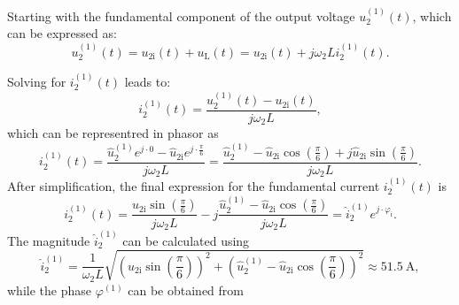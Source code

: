 \begin{solutionblock}
    Starting with the fundamental component of the output voltage $u^\mathrm{(1)}_\mathrm{2}(t)$, which can be expressed as:
    \begin{equation}
        u^\mathrm{(1)}_\mathrm{2}(t) = u_{2\mathrm{i}}(t) + u_{\mathrm{L}}(t) = u_{2\mathrm{i}}(t) + j \omega_\mathrm{2} L i^\mathrm{(1)}_\mathrm{2}(t).
        \label{7.1.2:eq:u_2_fund}         
    \end{equation}
   
    Solving for $i^\mathrm{(1)}_\mathrm{2}(t)$ leads to:
    \begin{equation}
        i^\mathrm{(1)}_\mathrm{2}(t) = \frac{u^\mathrm{(1)}_\mathrm{2}(t) - u_{2\mathrm{i}}(t)}{j \omega_\mathrm{2} L},
        \label{7.1.2:eq:i_2_fund}         
    \end{equation}
    which can be representred in phasor as 
    \begin{equation}
        i^\mathrm{(1)}_\mathrm{2}(t) = \frac{\hat{u}^\mathrm{(1)}_\mathrm{2} e^{j \cdot 0} - \hat{u}_{2\mathrm{i}} e^{j \cdot \frac{\pi}{6}}}{j \omega_\mathrm{2} L} = \frac{\hat{u}^\mathrm{(1)}_\mathrm{2} - \hat{u}_{2\mathrm{i}} \cos(\frac{\pi}{6}) + j \hat{u}_{2\mathrm{i}} \sin(\frac{\pi}{6})}{j \omega_\mathrm{2} L}.
        \label{7.1.2:eq:i_2_fund_phasor}         
    \end{equation}
    After simplification, the final expression for the fundamental current $i^\mathrm{(1)}_\mathrm{2}(t)$ is 
    \begin{equation}
        i^\mathrm{(1)}_\mathrm{2}(t) = \frac{\hat{u}_{2\mathrm{i}} \sin(\frac{\pi}{6})}{j \omega_\mathrm{2} L} - j \frac{\hat{u}^\mathrm{(1)}_\mathrm{2} - \hat{u}_{2\mathrm{i}} \cos(\frac{\pi}{6})}{j \omega_\mathrm{2} L} = \hat{i}^\mathrm{(1)}_\mathrm{2} e^{j \cdot \varphi_\mathrm{i}}.
        \label{7.1.2:eq:i_2_fund_simplified}         
    \end{equation}
    The magnitude $\hat{i}^\mathrm{(1)}_\mathrm{2}$ can be calculated using 
    \begin{equation}
        \hat{i}^\mathrm{(1)}_\mathrm{2} = \frac{1}{\omega_\mathrm{2} L}\sqrt{(\hat{u}_{2\mathrm{i}} \sin(\frac{\pi}{6}))^2 + (\hat{u}^\mathrm{(1)}_\mathrm{2} - \hat{u}_{2\mathrm{i}} \cos(\frac{\pi}{6}))^2} \approx \SI{51.5}{\ampere},
        \label{7.1.2:eq:mag_i_2_fund}         
    \end{equation}
    while the phase $\varphi^\mathrm{(1)}$ can be obtained from
    \begin{equation}

\end{equation}
\end{solutionblock}
